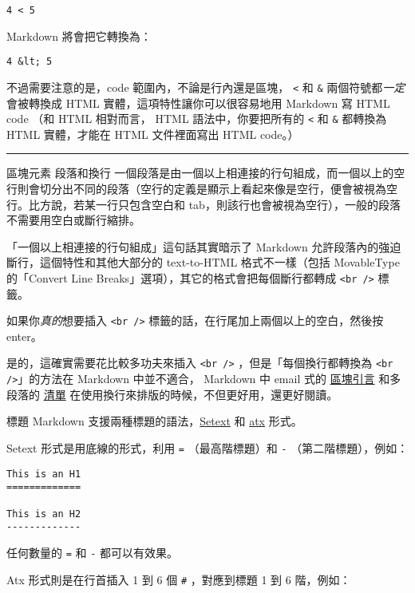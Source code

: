 \begin{verbatim}
4 < 5
\end{verbatim}
Markdown 將會把它轉換為：

\begin{verbatim}
4 &lt; 5
\end{verbatim}
不過需要注意的是，code 範圍內，不論是行內還是區塊， \texttt{\textless{}} 和
\texttt{\&} 兩個符號都\emph{一定}會被轉換成 HTML
實體，這項特性讓你可以很容易地用 Markdown 寫 HTML code （和 HTML 相對而言，
HTML 語法中，你要把所有的 \texttt{\textless{}} 和 \texttt{\&} 都轉換為
HTML 實體，才能在 HTML 文件裡面寫出 HTML code。）

\begin{center}\rule{3in}{0.4pt}\end{center}

區塊元素
段落和換行
一個段落是由一個以上相連接的行句組成，而一個以上的空行則會切分出不同的段落（空行的定義是顯示上看起來像是空行，便會被視為空行。比方說，若某一行只包含空白和
tab，則該行也會被視為空行），一般的段落不需要用空白或斷行縮排。

「一個以上相連接的行句組成」這句話其實暗示了 Markdown
允許段落內的強迫斷行，這個特性和其他大部分的 text-to-HTML 格式不一樣（包括
MovableType 的「Convert Line Breaks」選項），其它的格式會把每個斷行都轉成
\texttt{\textless{}br /\textgreater{}} 標籤。

如果你\emph{真的}想要插入 \texttt{\textless{}br /\textgreater{}}
標籤的話，在行尾加上兩個以上的空白，然後按 enter。

是的，這確實需要花比較多功夫來插入 \texttt{\textless{}br /\textgreater{}}
，但是「每個換行都轉換為 \texttt{\textless{}br /\textgreater{}}」的方法在
Markdown 中並不適合， Markdown 中 email 式的
\href{\#blockquote}{區塊引言} 和多段落的 \href{\#list}{清單}
在使用換行來排版的時候，不但更好用，還更好閱讀。

標題
Markdown
支援兩種標題的語法，\href{http://docutils.sourceforge.net/mirror/setext.html}{Setext}
和 \href{http://www.aaronsw.com/2002/atx/}{atx} 形式。

Setext 形式是用底線的形式，利用 \texttt{=} （最高階標題）和 \texttt{-}
（第二階標題），例如：

\begin{verbatim}
This is an H1
=============

This is an H2
-------------
\end{verbatim}
任何數量的 \texttt{=} 和 \texttt{-} 都可以有效果。

Atx 形式則是在行首插入 1 到 6 個 \texttt{\#} ，對應到標題 1 到 6 階，例如：

